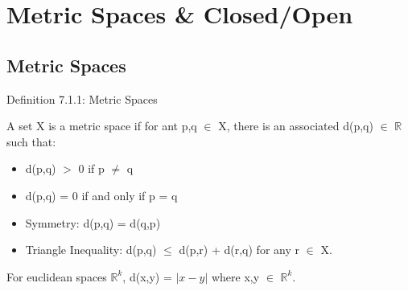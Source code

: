 \newpage

\section[Day 7: Metric Spaces and Closed/Open]{ Metric Spaces \& Closed/Open }

\subsection{ Metric Spaces }

{ \color{blue} Definition 7.1.1: Metric Spaces } 

	\begin{adjustbox}{minipage=14cm, right, vspace=0.1cm 0cm}
		A set X is a metric space if for ant p,q $\in$ X, there is an associated d(p,q) $\in$
		$\mathbb{R}$ such that:

		\begin{itemize}[leftmargin=1cm, itemsep=0.1cm]
			\item d(p,q) $>$ 0 \qquad \qquad if p $\neq$ q
			
			\item d(p,q) = 0 if and only if p = q
			
			\item {\color{lblue} Symmetry}:
				d(p,q) = d(q,p)
			
			\item {\color{lblue} Triangle Inequality}:
				d(p,q) $\leq$ d(p,r) + d(r,q) \qquad \qquad for any r $\in$ X.
		\end{itemize}

		For euclidean spaces $\mathbb{R}^k$, d(x,y) = $| x - y |$ where x,y $\in$ $\mathbb{R}^k$. \\
	\end{adjustbox}

